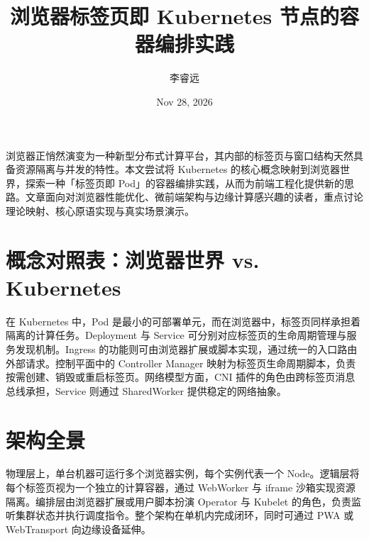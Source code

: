 \title{浏览器标签页即 Kubernetes 节点的容器编排实践}
\author{李睿远}
\date{Nov 28, 2026}
\maketitle
浏览器正悄然演变为一种新型分布式计算平台，其内部的标签页与窗口结构天然具备资源隔离与并发的特性。本文尝试将 Kubernetes 的核心概念映射到浏览器世界，探索一种「标签页即 Pod」的容器编排实践，从而为前端工程化提供新的思路。文章面向对浏览器性能优化、微前端架构与边缘计算感兴趣的读者，重点讨论理论映射、核心原语实现与真实场景演示。\par
\chapter{概念对照表：浏览器世界 vs. Kubernetes}
在 Kubernetes 中，Pod 是最小的可部署单元，而在浏览器中，标签页同样承担着隔离的计算任务。Deployment 与 Service 可分别对应标签页的生命周期管理与服务发现机制。Ingress 的功能则可由浏览器扩展或脚本实现，通过统一的入口路由外部请求。控制平面中的 Controller Manager 映射为标签页生命周期脚本，负责按需创建、销毁或重启标签页。网络模型方面，CNI 插件的角色由跨标签页消息总线承担，Service 则通过 SharedWorker 提供稳定的网络抽象。\par
\chapter{架构全景}
物理层上，单台机器可运行多个浏览器实例，每个实例代表一个 Node。逻辑层将每个标签页视为一个独立的计算容器，通过 WebWorker 与 iframe 沙箱实现资源隔离。编排层由浏览器扩展或用户脚本扮演 Operator 与 Kubelet 的角色，负责监听集群状态并执行调度指令。整个架构在单机内完成闭环，同时可通过 PWA 或 WebTransport 向边缘设备延伸。\par
